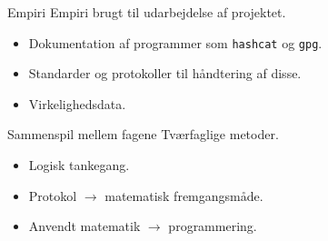 \documentclass[10pt, aspectratio=169, usepdftitle=false]{beamer}
\begin{document}
\begin{frame}{Empiri}
    \alert{Empiri brugt til udarbejdelse af projektet.}
    \begin{itemize}
        \item Dokumentation af programmer som \texttt{hashcat} og \texttt{gpg}.
        \item Standarder og protokoller til håndtering af disse.
        \item Virkelighedsdata.
    \end{itemize}
\end{frame}

\begin{frame}{Sammenspil mellem fagene}
    \alert{Tværfaglige metoder.}
    \begin{itemize}
        \item Logisk tankegang.
        \item Protokol \(\rightarrow\) matematisk fremgangsmåde.
        \item Anvendt matematik \(\rightarrow\) programmering.
    \end{itemize}
\end{frame}

\end{document}

